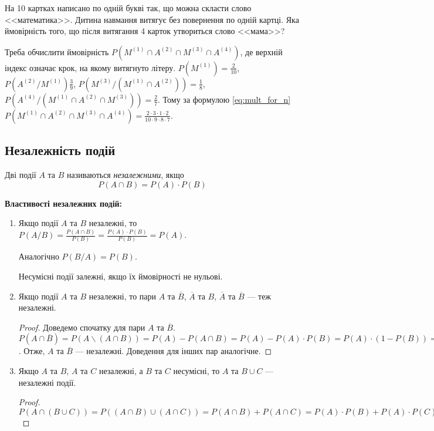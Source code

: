 \begin{example}
    На 10 картках написано по одній букві так, що можна скласти слово <<математика>>.
    Дитина навмання витягує без повернення по одній картці. Яка ймовірність того, що після витягання 4 карток
    утвориться слово <<мама>>?

    Треба обчислити ймовірність $P(M^{(1)} \cap A^{(2)} \cap M^{(3)} \cap A^{(4)})$,
    де верхній індекс означає крок, на якому витягнуто літеру.
    $P(M^{(1)}) = \frac{2}{10}$, $P(A^{(2)} / M^{(1)}) \frac{3}{9}$,
    $P(M^{(3)}/(M^{(1)} \cap A^{(2)})) = \frac{1}{8}$, $P(A^{(4)} / (M^{(1)} \cap A^{(2)} \cap M^{(3)})) = \frac{2}{7}$.
    Тому за формулою \eqref{eq:mult_for_n} $P(M^{(1)} \cap A^{(2)} \cap M^{(3)} \cap A^{(4)}) = \frac{2 \cdot 3 \cdot 1 \cdot 2}{10 \cdot 9 \cdot 8 \cdot 7}$.
\end{example}

\subsection{Незалежність подій}
\begin{definition}
    Дві події $A$ та $B$ називаються \emph{незалежними}, якщо
    \begin{equation}
        P(A\cap B) = P(A)\cdot P(B)
    \end{equation}
\end{definition}
\noindent \textbf{Властивості незалежних подій:}
\begin{enumerate}
    \item Якщо події $A$ та $B$ незалежні, то $P(A/B) = \frac{P(A\cap B)}{P(B)} = \frac{P(A)\cdot P(B)}{P(B)} = P(A)$.
    
    Аналогічно $P(B/A) = P(B)$.
    \begin{remark}
        Несумісні події залежні, якщо їх ймовірності не нульові.
    \end{remark}

    \item Якщо події $A$ та $B$ незалежні, то пари $A$ та $\overline{B}$, 
    $\overline{A}$ та $B$, $\overline{A}$ та $\overline{B}$ --- теж незалежні.
    \begin{proof}
        Доведемо спочатку для пари $A$ та $\overline{B}$. $P(A\cap \overline{B}) = P(A\backslash (A\cap B)) = P(A) - P(A\cap B) = P(A) - P(A)\cdot P(B) = P(A)\cdot (1 - P(B)) = P(A)\cdot P(\overline{B})$.
        Отже, $A$ та $\overline{B}$ --- незалежні. Доведення для інших пар аналогічне.
    \end{proof}
    \item Якщо $A$ та $B$, $A$ та $C$ незалежні, а $B$ та $C$ несумісні, то $A$ та $B\cup C$ --- незалежні події.
    \begin{proof}
        $P(A\cap (B \cup C)) = P((A \cap B) \cup (A \cap C)) = P(A\cap B) + P(A\cap C) = P(A)\cdot P(B) + P(A)\cdot P(C) = P(A) \cdot (P(B) + P(C)) = P(A)\cdot P(B\cup C).$
    \end{proof}
\end{enumerate}
